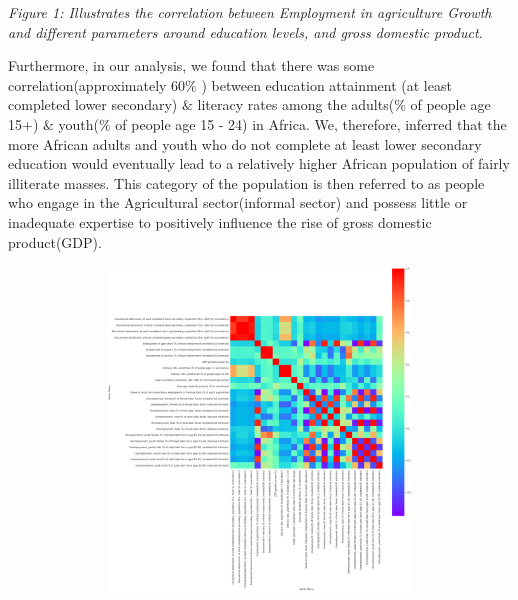 \documentclass[12pt]{article}
\renewcommand{\_}{\kern-1.5pt\textunderscore\kern-1.5pt}
\begin{document}


\vspace{\baselineskip}
\vspace{\baselineskip}
\begin{justify}
{\fontsize{8pt}{9.6pt}\selectfont \textit{Figure 1: Illustrates the correlation between Employment in agriculture Growth and different parameters around education levels, and gross domestic product.}\par}
\end{justify}

\vspace{\baselineskip}
\begin{justify}
{\fontsize{9pt}{10.8pt}\selectfont Furthermore, in our analysis, we found that there was some correlation(approximately 60$\%$ ) between education attainment (at least completed lower secondary) $\&$  literacy rates among the adults($\%$  of people age 15+) $\&$  youth($\%$  of people age 15 - 24) in Africa. We, therefore, inferred that the more African adults and youth who do not complete at least lower secondary education would eventually lead to a relatively higher African population of fairly illiterate masses. This category of the population is then referred to as people who engage in the Agricultural sector(informal sector) and possess little or inadequate expertise to positively influence the rise of gross domestic product(GDP).\par}
\end{justify}



\begin{figure}[H]
	\begin{Center}
		\includegraphics[width=6.95in,height=3.39in]{./media/image4.png}
	\end{Center}
\end{figure}
\end{document}
